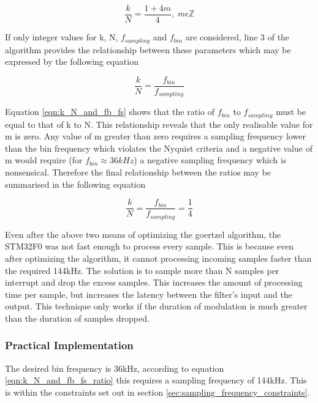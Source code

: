 \begin{equation}
\label{eqn:k_N_constraint}
	\frac{k}{N} = \frac{1+4m}{4},\; m\epsilon \mathbb{Z}
\end{equation}

If only integer values for k, N, $f_{sampling}$ and $f_{bin}$ are considered, line 3 of the algorithm provides the relationship between these parameters which may be expressed by the following equation

\begin{equation}
\label{eqn:k_N_and_fb_fs}
	\frac{k}{N} = \frac{f_{bin}}{f_{sampling}}
\end{equation}


Equation \ref{eqn:k_N_and_fb_fs} shows that the ratio of $f_{bin}$ to $f_{sampling}$ must be equal to that of k to N. This relationship reveals that the only realisable value for m is zero. Any value of m greater than zero requires a sampling frequency lower than the bin frequency which violates the Nyquist criteria and a negative value of m would require (for $f_{bin} \approx 36kHz$) a negative sampling frequency which is nonsensical. Therefore the final relationship between the ratios may be summarised in the following equation

\begin{equation}
\label{eqn:k_N_and_fb_fs_ratio}
\frac{k}{N} = \frac{f_{bin}}{f_{sampling}} = \frac{1}{4}
\end{equation}

Even after the above two means of optimizing the goertzel algorithm, the STM32F0 was not fast enough to process every sample. This is because even after optimizing the algorithm, it cannot processing incoming samples faster than the required 144kHz. The solution is to sample more than N samples per interrupt and drop the excess samples. This increases the amount of processing time per sample, but increases the latency between the filter's input and the output. This technique only works if the duration of modulation is much greater than the duration of samples dropped.

\subsubsection{Practical Implementation}

The desired bin frequency is 36kHz, according to equation \ref{eqn:k_N_and_fb_fs_ratio} this requires a sampling frequency of 144kHz. This is within the constraints set out in section \ref{sec:sampling_frequency_constraints}.


